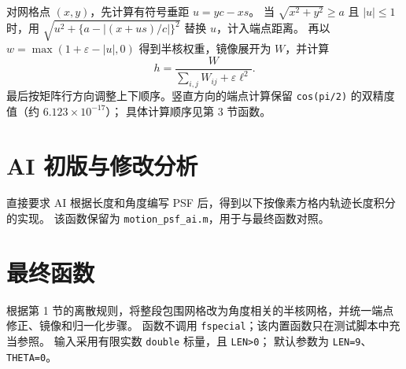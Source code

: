 \documentclass[UTF8,12pt,a4paper]{ctexart}
\begin{document}
对网格点 $(x,y)$，先计算有符号垂距 $u=yc-xs$。
当 $\sqrt{x^2+y^2}\ge a$ 且 $|u|\le1$ 时，用
$\sqrt{u^2+\{a-|(x+us)/c|\}^2}$ 替换 $u$，计入端点距离。
再以 $w=\max(1+\varepsilon-|u|,0)$ 得到半核权重，镜像展开为 $W$，并计算
\begin{equation}
 h=\frac{W}{\sum_{i,j}W_{ij}+\varepsilon\ell^2}.
\end{equation}
最后按矩阵行方向调整上下顺序。竖直方向的端点计算保留
\texttt{cos(pi/2)} 的双精度值（约 $6.123\times10^{-17}$）；
具体计算顺序见第 3 节函数。

\clearpage
\section{AI 初版与修改分析}
直接要求 AI 根据长度和角度编写 PSF 后，得到以下按像素方格内轨迹长度积分的实现。
该函数保留为 \texttt{motion\_psf\_ai.m}，用于与最终函数对照。




\clearpage
\section{最终函数}
根据第 1 节的离散规则，将整段包围网格改为角度相关的半核网格，并统一端点修正、镜像和归一化步骤。
函数不调用 \texttt{fspecial}；该内置函数只在测试脚本中充当参照。
输入采用有限实数 \texttt{double} 标量，且 \texttt{LEN>0}；
默认参数为 \texttt{LEN=9}、\texttt{THETA=0}。


\clearpage
\end{document}
